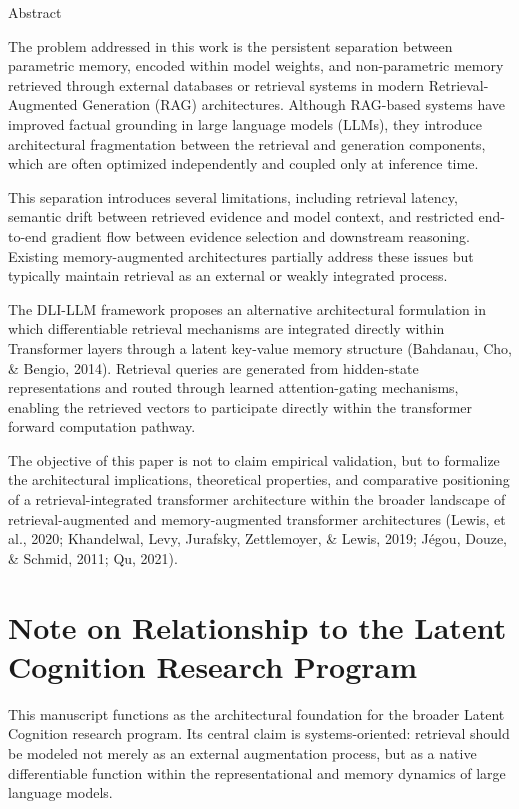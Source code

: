\documentclass[
]{article}
\begin{document}
Abstract

The problem addressed in this work is the persistent separation between
parametric memory, encoded within model weights, and non-parametric
memory retrieved through external databases or retrieval systems in
modern Retrieval-Augmented Generation (RAG) architectures. Although
RAG-based systems have improved factual grounding in large language
models (LLMs), they introduce architectural fragmentation between the
retrieval and generation components, which are often optimized
independently and coupled only at inference time.

This separation introduces several limitations, including retrieval
latency, semantic drift between retrieved evidence and model context,
and restricted end-to-end gradient flow between evidence selection and
downstream reasoning. Existing memory-augmented architectures partially
address these issues but typically maintain retrieval as an external or
weakly integrated process.

The DLI-LLM framework proposes an alternative architectural formulation
in which differentiable retrieval mechanisms are integrated directly
within Transformer layers through a latent key-value memory structure
(Bahdanau, Cho, \& Bengio, 2014). Retrieval queries are generated from
hidden-state representations and routed through learned attention-gating
mechanisms, enabling the retrieved vectors to participate directly
within the transformer forward computation pathway.

The objective of this paper is not to claim empirical validation, but to
formalize the architectural implications, theoretical properties, and
comparative positioning of a retrieval-integrated transformer
architecture within the broader landscape of retrieval-augmented and
memory-augmented transformer architectures (Lewis, et al., 2020;
Khandelwal, Levy, Jurafsky, Zettlemoyer, \& Lewis, 2019; Jégou, Douze,
\& Schmid, 2011; Qu, 2021).

\section*{Note on Relationship to the Latent Cognition Research Program}

This manuscript functions as the architectural foundation for the broader Latent Cognition research program. Its central claim is systems-oriented: retrieval should be modeled not merely as an external augmentation process, but as a native differentiable function within the representational and memory dynamics of large language models.
\end{document}
